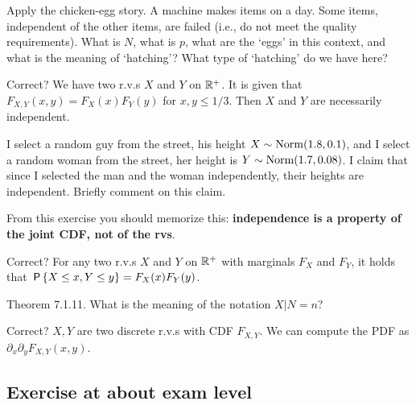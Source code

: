 \documentclass[assignments]{subfiles}
\begin{document}
\begin{exercise}
Apply the chicken-egg story.
A machine makes items on a day.
Some items, independent of the other items, are failed (i.e., do not meet the quality requirements).
What is $N$, what is $p$, what are the `eggs' in this context, and what is the meaning of `hatching'?
What type of `hatching' do we have here?
\end{exercise}



\begin{exercise}
Correct? We have two r.v.s $X$ and $Y$ on $\R^{+}$. It is given that $F_{X,Y}(x,y) = F_X(x)F_Y(y)$ for $x,y \leq 1/3$. Then  $X$ and $Y$ are necessarily independent.
\end{exercise}

\begin{exercise}
I select a random guy from the street, his height $X\sim\Norm{1.8, 0.1}$, and I select a random woman from the street, her height is $Y\sim\Norm{1.7, 0.08}$.
I claim that since I selected the man and the woman independently, their heights are independent.
Briefly comment on this claim.
\begin{hint}
From this exercise you should memorize this: \textbf{independence is a property of the joint CDF, not of the rvs}.
\end{hint}
\end{exercise}


\begin{exercise}
Correct? For any two r.v.s $X$ and $Y$ on $\R^{+}$ with marginals $F_{X}$ and $F_{Y}$, it holds that $\P{X\leq x, Y\leq y} = F_{X}(x) F_{Y}(y)$.
\end{exercise}

\begin{exercise}
Theorem 7.1.11. What is the meaning of the notation $X|N=n$?
\end{exercise}

\begin{exercise}
Correct? $X, Y$ are two discrete r.v.s with CDF $F_{X,Y}$. We can compute the PDF as $\partial_{x}\partial_{y} F_{X,Y}(x,y)$.
\end{exercise}


\subsection{Exercise at about exam level}
\label{sec:below-exam-level}
\end{document}
